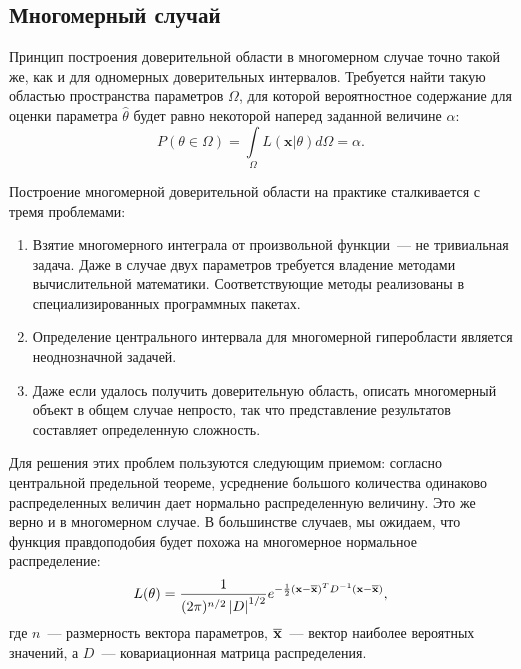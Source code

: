 \subsection{Многомерный случай}

Принцип построения доверительной области в многомерном случае точно
такой же, как и для одномерных доверительных интервалов. Требуется найти
такую областью пространства параметров $\Omega$, для которой
вероятностное содержание для оценки параметра $\hat \theta$
будет равно некоторой наперед заданной
величине $\alpha$:
\begin{equation}
    P(\theta \in \Omega) = \int\limits_\Omega{L(\mathbf{x} | \theta)}d\Omega = \alpha.
\end{equation}

Построение многомерной доверительной области на практике сталкивается с тремя
проблемами:
\begin{enumerate}
\item Взятие многомерного интеграла от произвольной функции~--- не тривиальная
  задача. Даже в случае двух параметров требуется владение
  методами вычислительной математики. Соответствующие методы реализованы
  в специализированных программных пакетах.
\item Определение центрального интервала для многомерной гиперобласти
является неоднозначной задачей.
\item Даже если удалось получить доверительную область, описать многомерный
объект в общем случае непросто, так что представление результатов
  составляет определенную сложность.
\end{enumerate}

Для решения этих проблем пользуются следующим приемом: согласно
центральной предельной теореме, усреднение большого количества одинаково
распределенных величин дает нормально распределенную величину. Это же
верно и в многомерном случае. В большинстве случаев, мы ожидаем, что
функция правдоподобия будет похожа на многомерное нормальное
распределение:
\begin{equation}
    L(\theta) = \frac{1}{(2 \pi)^{n/2}\left|D\right|^{1/2}} e^{-\frac{1}{2}
        (\mathbf{x} - \overline{\mathbf{x}})^T D^{-1} (\mathbf{x} - \overline{\mathbf{x}})},
\end{equation}
где $n$~--- размерность вектора параметров, $\overline{\mathbf{x}}$~--- вектор
наиболее вероятных значений, а $D$~--- ковариационная матрица распределения.

